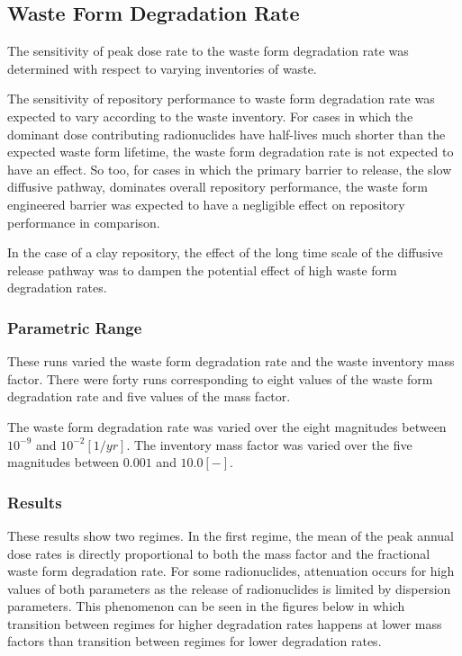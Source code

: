 
\subsection{Waste Form Degradation Rate}


The sensitivity of peak dose rate to the waste form degradation rate was 
determined with respect to varying inventories of waste.

The sensitivity of repository performance to waste form degradation rate was
expected to vary according to the waste inventory. For cases in which the dominant dose contributing 
radionuclides have half-lives much shorter than the expected waste form lifetime, 
the waste form degradation rate is not expected to have an effect. So too, for 
cases in which the primary barrier to release, the slow diffusive pathway, 
dominates overall repository performance, the waste form engineered barrier was
expected to have a negligible effect on repository performance in comparison.

In the case of a clay repository, the effect of the long time scale of the 
diffusive release pathway was to dampen the potential effect of high waste form 
degradation rates. 

\subsubsection{Parametric Range}

These runs varied the waste form degradation rate and the waste inventory mass 
factor.  There were forty runs corresponding to eight values of the waste form degradation 
rate and five values of the mass factor.

The waste form degradation rate was varied over the eight magnitudes 
between $10^{-9}$ and $10^{-2} [1/yr]$. The inventory mass factor was varied 
over the five magnitudes between $0.001$ and $10.0 [-]$. 

\subsubsection{Results}

These results show two regimes. In the first regime, the mean of the peak annual 
dose rates is directly proportional to both the mass factor and the fractional 
waste form degradation rate. For some radionuclides, attenuation occurs for high 
values of both parameters as the release of radionuclides is limited by 
dispersion parameters. This phenomenon can be seen in the figures below in which 
transition between regimes for higher degradation rates happens at lower mass 
factors than transition between regimes for lower degradation rates. 

